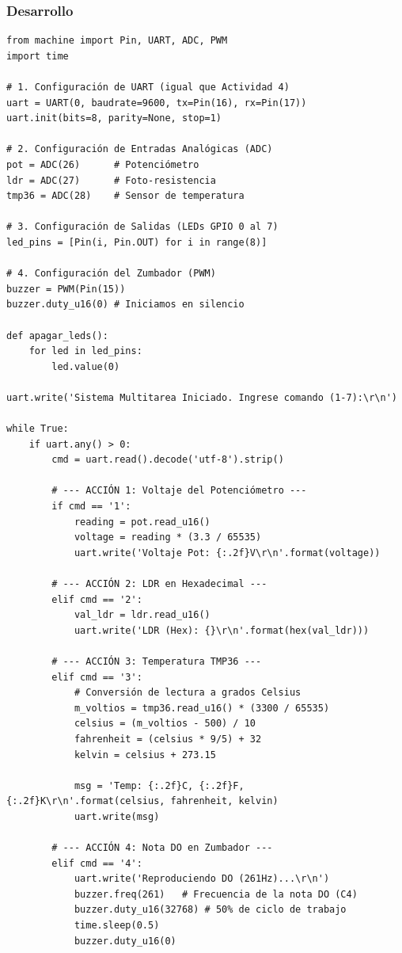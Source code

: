\subsubsection{Desarrollo}
\begin{lstlisting}
from machine import Pin, UART, ADC, PWM
import time

# 1. Configuración de UART (igual que Actividad 4)
uart = UART(0, baudrate=9600, tx=Pin(16), rx=Pin(17))
uart.init(bits=8, parity=None, stop=1)

# 2. Configuración de Entradas Analógicas (ADC)
pot = ADC(26)      # Potenciómetro
ldr = ADC(27)      # Foto-resistencia
tmp36 = ADC(28)    # Sensor de temperatura

# 3. Configuración de Salidas (LEDs GPIO 0 al 7)
led_pins = [Pin(i, Pin.OUT) for i in range(8)]

# 4. Configuración del Zumbador (PWM)
buzzer = PWM(Pin(15))
buzzer.duty_u16(0) # Iniciamos en silencio

def apagar_leds():
    for led in led_pins:
        led.value(0)

uart.write('Sistema Multitarea Iniciado. Ingrese comando (1-7):\r\n')

while True:
    if uart.any() > 0:
        cmd = uart.read().decode('utf-8').strip()
        
        # --- ACCIÓN 1: Voltaje del Potenciómetro ---
        if cmd == '1':
            reading = pot.read_u16()
            voltage = reading * (3.3 / 65535)
            uart.write('Voltaje Pot: {:.2f}V\r\n'.format(voltage))

        # --- ACCIÓN 2: LDR en Hexadecimal ---
        elif cmd == '2':
            val_ldr = ldr.read_u16()
            uart.write('LDR (Hex): {}\r\n'.format(hex(val_ldr)))

        # --- ACCIÓN 3: Temperatura TMP36 ---
        elif cmd == '3':
            # Conversión de lectura a grados Celsius
            m_voltios = tmp36.read_u16() * (3300 / 65535)
            celsius = (m_voltios - 500) / 10
            fahrenheit = (celsius * 9/5) + 32
            kelvin = celsius + 273.15
            
            msg = 'Temp: {:.2f}C, {:.2f}F, {:.2f}K\r\n'.format(celsius, fahrenheit, kelvin)
            uart.write(msg)

        # --- ACCIÓN 4: Nota DO en Zumbador ---
        elif cmd == '4':
            uart.write('Reproduciendo DO (261Hz)...\r\n')
            buzzer.freq(261)   # Frecuencia de la nota DO (C4)
            buzzer.duty_u16(32768) # 50% de ciclo de trabajo
            time.sleep(0.5)
            buzzer.duty_u16(0)


\end{lstlisting}
